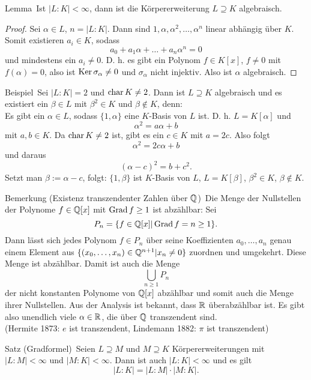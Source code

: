 \begin{genericdf}{Lemma}\label{skript:13.6}\
	Ist $|L:K| <\infty$, dann ist die Körpererweiterung $L\supseteq K$ algebraisch.
\end{genericdf}

\begin{proof}
	Sei $\alpha\in L$, $n=|L:K|$. Dann sind $1, \alpha, \alpha^2, \ldots, \alpha^n$ linear abhängig über $K$. Somit existieren $a_i\in K$, sodass
	\[a_0+a_1\alpha+\ldots+a_n\alpha^n=0\]
	und mindestens ein $a_i\neq0$. D. h. es gibt ein Polynom $f\in K[x]$, $f\neq0$ mit $f(\alpha)=0$, also ist $\operatorname{Ker} \sigma_\alpha\neq0$ und $\sigma_\alpha$ nicht injektiv. Also ist $\alpha$ algebraisch.
\end{proof}

\begin{genericdf}{Beispiel}\label{skript:13.7}\
	Sei $|L:K|=2$ und $\operatorname{char} K\neq2$. Dann ist $L\supseteq K$ algebraisch und es existiert ein $\beta\in L$ mit $\beta^2\in K$ und $\beta\notin K$, denn:\\
	Es gibt ein $\alpha\in L$, sodass $\{1,\alpha\}$ eine $K$-Basis von $L$ ist. D. h. $L=K[\alpha]$ und
	\[\alpha^2=a\alpha+b\]
	mit $a,b\in K$. Da $\operatorname{char} K\neq2$ ist, gibt es ein $c\in K$ mit $a=2c$. Also folgt
	\[\alpha^2=2c\alpha+b\]
	und daraus
	\[(\alpha-c)^2=b+c^2.\]
	Setzt man $\beta:=\alpha-c$, folgt: $\{1,\beta\}$ ist $K$-Basis von $L$, $L=K[\beta]$, $\beta^2\in K$, $\beta\notin K$.
\end{genericdf}

\begin{genericdf}{Bemerkung (Existenz transzendenter Zahlen über $\mathbb{Q}$)}\label{skript:13.8}\
	Die Menge der Nullstellen der Polynome $f\in\mathbb{Q}[x]$ mit $\operatorname{Grad} f\geq 1$ ist abzählbar: Sei
	\[P_n=\{f\in\mathbb{Q}[x]|\operatorname{Grad} f=n\geq1\}.\]
	Dann lässt sich jedes Polynom $f\in P_n$ über seine Koeffizienten $a_0,\ldots,a_n$ genau einem Element aus $\{(x_0,\ldots,x_n)\in\mathbb{Q}^{n+1}|x_n\neq0\}$ zuordnen und umgekehrt. Diese Menge ist abzählbar. Damit ist auch die Menge
	\[\bigcup_{n\geq1}P_n\]
	der nicht konstanten Polynome von $\mathbb{Q}[x]$ abzählbar und somit auch die Menge ihrer Nullstellen. Aus der Analysis ist bekannt, dass $\mathbb{R}$ überabzählbar ist. Es gibt also unendlich viele $\alpha\in\mathbb{R}$, die über $\mathbb{Q}$ transzendent sind.\\
	(Hermite 1873: $e$ ist transzendent, Lindemann 1882: $\pi$ ist transzendent)
\end{genericdf}

\begin{genericdf}{Satz (Gradformel)}\label{skript:13.9}\
	Seien $L\supseteq M$ und $M\supseteq K$ Körpererweiterungen mit $|L:M|<\infty$ und $|M:K|<\infty$. Dann ist auch $|L:K|<\infty$ und es gilt
	\[|L:K|=|L:M|\cdot|M:K|.\]
\end{genericdf}


